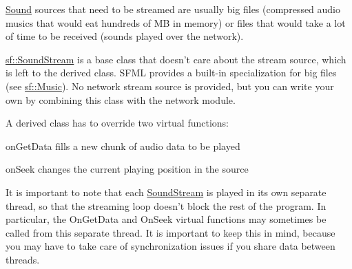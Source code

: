 \hyperlink{classsf_1_1Sound}{Sound} sources that need to be streamed are usually big files (compressed audio musics that would eat hundreds of M\-B in memory) or files that would take a lot of time to be received (sounds played over the network).

\hyperlink{classsf_1_1SoundStream}{sf\-::\-Sound\-Stream} is a base class that doesn't care about the stream source, which is left to the derived class. S\-F\-M\-L provides a built-\/in specialization for big files (see \hyperlink{classsf_1_1Music}{sf\-::\-Music}). No network stream source is provided, but you can write your own by combining this class with the network module.

A derived class has to override two virtual functions\-: \begin{DoxyItemize}
\item on\-Get\-Data fills a new chunk of audio data to be played \item on\-Seek changes the current playing position in the source\end{DoxyItemize}
It is important to note that each \hyperlink{classsf_1_1SoundStream}{Sound\-Stream} is played in its own separate thread, so that the streaming loop doesn't block the rest of the program. In particular, the On\-Get\-Data and On\-Seek virtual functions may sometimes be called from this separate thread. It is important to keep this in mind, because you may have to take care of synchronization issues if you share data between threads.


